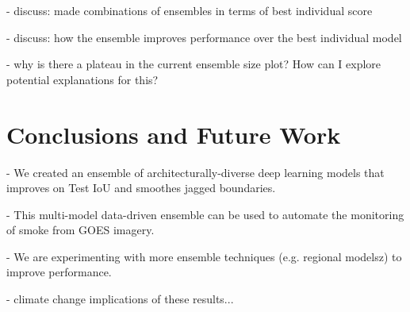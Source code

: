 \documentclass{article}
\begin{document}
- discuss: made combinations of ensembles in terms of best individual score 

- discuss: how the ensemble improves performance over the best individual model

- why is there a plateau in the current ensemble size plot? How can I explore potential explanations for this? 

\section{Conclusions and Future Work}
- We created an ensemble of architecturally-diverse deep learning models that improves on Test IoU and smoothes jagged boundaries.

- This multi-model data-driven ensemble can be used to automate the monitoring of smoke from GOES imagery.

- We are experimenting with more ensemble techniques (e.g. regional modelsz) to improve performance.

- climate change implications of these results...




\end{document}

